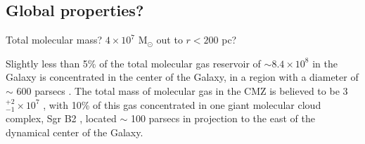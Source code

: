 \subsection{Global properties?}

Total molecular mass?  $4\times10^7$ M$_\odot$ out to $r<200$ pc?

 Slightly less than 5\% of the total molecular gas reservoir of $\sim8.4\times10^8$ \msun in the Galaxy is concentrated in the center of the Galaxy, in a region with a diameter of $\sim$ 600 parsecs \citep{Dahmen98,Nakanishi06}. The total mass of molecular gas in the CMZ is believed to be 3$^{+2}_{-1}\times10^7$ \msun \citep{Dahmen98}, with 10\% of this gas concentrated in one giant molecular cloud complex, Sgr B2 \citep{Gordon93}, located $\sim$ 100 parsecs in projection to the east of the dynamical center of the Galaxy.